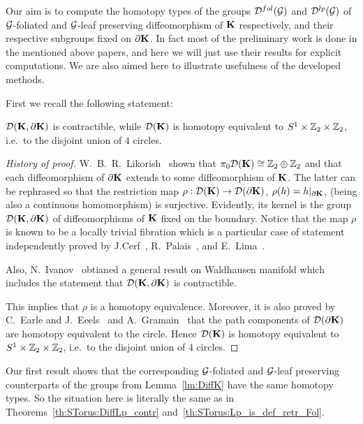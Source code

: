 Our aim is to compute the homotopy types of the groups $\mathcal{D}^{fol}(\mathcal{G})$ and $\mathcal{D}^{lp}(\mathcal{G})$ of $\mathcal{G}$-foliated and $\mathcal{G}$-leaf preserving diffeomorphism of $\mathbf{K}$ respectively, and their respective subgroups fixed on $\partial\mathbf{K}$.
In fact most of the preliminary work is done in the mentioned above papers, and here we will just use their results for explicit computations.
We are also aimed here to illustrate usefulness of the developed methods.

First we recall the following statement:
\begin{lemma}\label{lm:DiffK}
$\mathcal{D}(\mathbf{K},\partial\mathbf{K})$ is contractible, while $\mathcal{D}(\mathbf{K})$ is homotopy equivalent to $S^1\times\mathbb{Z}_2\times\mathbb{Z}_2$, i.e.\ to the disjoint union of $4$ circles.
\end{lemma}
\begin{proof}[History of proof]
W.~B.~R.~Likorish~\cite{Lickorish:PCPS:1963} shown that $\pi_0\mathcal{D}(\mathbf{K}) \cong \mathbb{Z}_{2}\oplus\mathbb{Z}_{2}$ and that each diffeomorphism of $\partial\mathbf{K}$ extends to some diffeomorphism of $\mathbf{K}$.
The latter can be rephrased so that the restriction map $\rho:\mathcal{D}(\mathbf{K}) \to \mathcal{D}(\partial\mathbf{K})$, $\rho(h)=h|_{\partial\mathbf{K}}$, (being also a continuous homomorphism) is surjective.
Evidently, its kernel is the group $\mathcal{D}(\mathbf{K},\partial\mathbf{K})$ of diffeomorphisms of $\mathbf{K}$ fixed on the boundary.
Notice that the map $\rho$ is known to be a locally trivial fibration which is a particular case of  statement independently proved by J.Cerf~\cite{Cerf:BSMF:1961}, R.~Palais~\cite{Palais:CMH:1960}, and E.~Lima~\cite{Lima:CMH:1964}.

Also, N.~Ivanov~\cite{Ivanov:ZNSL:1976} obtianed a general result on Waldhausen manifold which includes the statement that $\mathcal{D}(\mathbf{K},\partial\mathbf{K})$ is contractible.

This implies that $\rho$ is a homotopy equivalence.
Moreover, it is also proved by C.~Earle and J.~Eeels~\cite{EarleEells:JGD:1969} and A.~Gramain~\cite{Gramain:ASENS:1973} that the path components of $\mathcal{D}(\partial\mathbf{K})$ are homotopy equivalent to the circle.
Hence $\mathcal{D}(\mathbf{K})$ is homotopy equivalent to $S^1\times\mathbb{Z}_2\times\mathbb{Z}_2$, i.e.\ to the disjoint union of $4$ circles.
\end{proof}

Our first result shows that the corresponding $\mathcal{G}$-foliated and $\mathcal{G}$-leaf preserving counterparts of the groups from Lemma~\ref{lm:DiffK} have the same homotopy types.
So the situation here is literally the same as in Theorems~\ref{th:STorus:DiffLp_contr} and~\ref{th:STorus:Lp_is_def_retr_Fol}.

